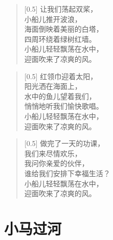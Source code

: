 \documentclass[12pt,UTF-8,openany]{ctexbook}
\begin{document}
\begin{large}
    
    \begin{verse}[0.5\linewidth]
        让我们荡起双桨， \\
        小船儿推开波浪， \\
        海面倒映着美丽的白塔， \\
        四周环绕着绿树红墙。 \\
        小船儿轻轻飘荡在水中， \\
        迎面吹来了凉爽的风。
    \end{verse}
    
    
    \begin{verse}[0.5\linewidth]
        红领巾迎着太阳， \\
        阳光洒在海面上， \\
        水中的鱼儿望着我们， \\
        悄悄地听我们愉快歌唱。 \\
        小船儿轻轻飘荡在水中， \\
        迎面吹来了凉爽的风。
    \end{verse}
    
    
    \begin{verse}[0.5\linewidth]
        做完了一天的功课， \\
        我们来尽情欢乐， \\
        我问你亲爱的伙伴， \\
        谁给我们安排下幸福生活？ \\
        小船儿轻轻飘荡在水中， \\
        迎面吹来了凉爽的风。
    \end{verse}
    
\end{large}



\chapter{小马过河}
\end{document}
